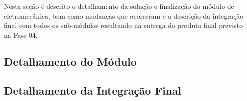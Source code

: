  \label{desenvolvimento_eletromecanica}

Nesta seção é descrito o detalhamento da solução e finalização do módulo de eletromecânica, bem como mudanças que ocorreram e a descrição da integração final com todos os sub-módulos resultando na entrega do produto final previsto na Fase 04.

\subsection{Detalhamento do Módulo}


\subsection{Detalhamento da Integração Final}







